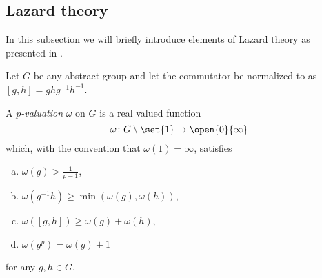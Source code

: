 


\subsection{Lazard theory}%
\label{subsec:Laz-theory}

In this subsection we will briefly introduce elements of Lazard theory as presented in \cite{Sch}.

Let $G$ be any abstract group and let the commutator be normalized to as $[g,h]=ghg^{-1}h^{-1}$.

\begin{definition}
  A \emph{$p$-valuation} $\omega$ on $G$ is a real valued function
  \begin{equation*}
    \omega \colon G \setminus \set{1} \to \open{0}{\infty}
  \end{equation*}%
  which, with the convention that $\omega(1)=\infty$, satisfies
  \begin{enumerate}[(a)]
    \item $\omega(g) > \tfrac{1}{p-1}$,
    \item $\omega(g^{-1}h) \geq \min(\omega(g),\omega(h))$,
    \item $\omega([g,h]) \geq \omega(g) + \omega(h)$,
    \item $\omega(g^p) = \omega(g)+1$
  \end{enumerate}
  for any $g,h\in G$.
\end{definition}

